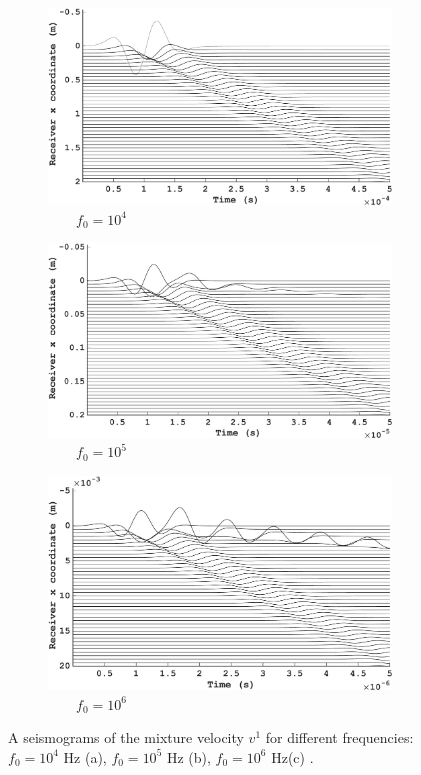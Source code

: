 \documentclass[3p,times,table]{article}
\begin{document}
\begin{figure}[!htbp]
\begin{subfigure}{0.3\linewidth}
\includegraphics[draft=false,width=1\textwidth, 
height=0.15\textheight]{Figures/frec_10_4_new2}
\caption{$\quad\quad f_0=10^{4} $}
\end{subfigure}
\hfill
\begin{subfigure}{0.3\linewidth}
\includegraphics[draft=false,width=1\textwidth, 
height=0.15\textheight]{Figures/frec_10_5_new2}
\caption{$\quad\quad f_0=10^{5} $}
\end{subfigure}%
\hfill
\begin{subfigure}{0.3\linewidth}
\includegraphics[draft=false,width=1\textwidth, 
height=0.15\textheight]{Figures/frec_10_6_new2}
\caption{$\quad\quad f_0=10^{6} $}
\end{subfigure}%
\caption{ A seismograms of the mixture velocity $v^1$ for different frequencies: $f_0=10^{4}$ Hz (a), $f_0=10^{5}$ Hz (b), $f_0=10^{6}$ Hz(c) .  }
\label{fig:compare_frewuency_trace}
\end{figure}
\end{document}
